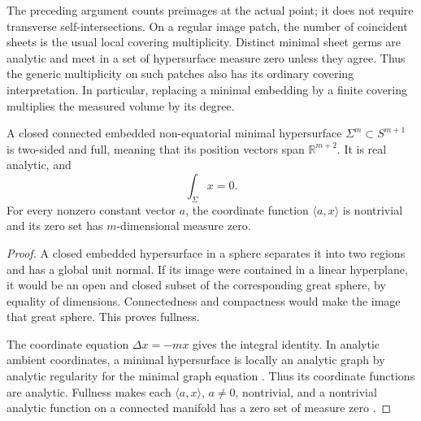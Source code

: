 \begin{remark}\label{rem:preliminaries-multiplicity}
The preceding argument counts preimages at the actual point; it does
not require transverse self-intersections. On a regular image patch,
the number of coincident sheets is the usual local covering
multiplicity. Distinct minimal sheet germs are analytic and meet in a
set of hypersurface measure zero unless they agree. Thus the generic
multiplicity on such patches also has its ordinary covering
interpretation. In particular, replacing a minimal embedding by a
finite covering multiplies the measured volume by its degree.
\end{remark}

\begin{lemma}\label{lem:fullness}
A closed connected embedded non-equatorial minimal hypersurface
\(\Sigma^m\subset S^{m+1}\) is two-sided and full, meaning that its
position vectors span \(\mathbb R^{m+2}\). It is real analytic, and
\[
\int_\Sigma x=0.
\]
For every nonzero constant vector \(a\), the coordinate function
\(\langle a,x\rangle\) is nontrivial and its zero set has
\(m\)-dimensional measure zero.
\end{lemma}

\begin{proof}
A closed embedded hypersurface in a sphere separates it into two
regions and has a global unit normal. If its image were contained in
a linear hyperplane, it would be an open and closed subset of the
corresponding great sphere, by equality of dimensions. Connectedness
and compactness would make the image that great sphere. This proves
fullness.

The coordinate equation \(\Delta x=-mx\) gives the integral identity.
In analytic ambient coordinates, a minimal hypersurface is locally an
analytic graph by analytic regularity for the minimal graph equation
\cite[Theorem~1.1]{Blatt2024}.
Thus its coordinate functions are analytic. Fullness makes each
\(\langle a,x\rangle\), \(a\ne0\), nontrivial, and a nontrivial analytic
function on a connected manifold has a zero set of measure zero
\cite[Proposition~0]{Mityagin2015}.
\end{proof}
